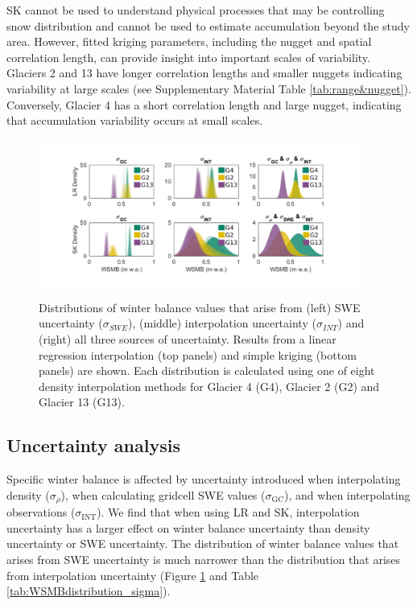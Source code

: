 \documentclass[twocolumn, letterpaper]{igs}
\begin{document}
SK cannot be used to understand physical processes that may be controlling snow distribution and cannot be used to estimate accumulation beyond the study area. However, fitted kriging parameters, including the nugget and spatial correlation length, can provide insight into important scales of variability. Glaciers 2 and 13 have longer correlation lengths and smaller nuggets indicating variability at large scales (see Supplementary Material Table \ref{tab:range&nugget}). Conversely, Glacier 4 has a short correlation length and large nugget, indicating that accumulation variability occurs at small scales.

\begin{figure}
	\centering
	\includegraphics[width =0.95\textwidth]{WSMBDist.pdf}\\
	\caption{Distributions of winter balance values that arise from (left) SWE uncertainty ($\sigma_{SWE}$), (middle) interpolation uncertainty ($\sigma_{INT}$) and (right) all three sources of uncertainty. Results from a linear regression interpolation (top panels) and simple kriging (bottom panels) are shown. Each distribution is calculated using one of eight density interpolation methods for Glacier 4 (G4), Glacier 2 (G2) and Glacier 13 (G13).}
	\label{fig:WSMBDist_LR}
\end{figure}

\subsection{Uncertainty analysis}

Specific winter balance is affected by uncertainty introduced when interpolating density ($\sigma_{\rho}$), when calculating gridcell SWE values ($\sigma_{\mathrm{GC}}$), and when interpolating observations ($\sigma_{\mathrm{INT}}$). We find that when using LR and SK, interpolation uncertainty has a larger effect on winter balance uncertainty than density uncertainty or SWE uncertainty. The distribution of winter balance values that arises from SWE uncertainty is much narrower than the distribution that arises from interpolation uncertainty (Figure \ref{fig:WSMBDist_LR} and Table \ref{tab:WSMBdistribution_sigma}).
\end{document}
